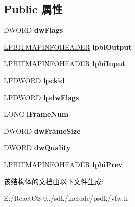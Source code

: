 \subsection*{Public 属性}
\begin{DoxyCompactItemize}
\item 
\mbox{\label{struct_i_c_c_o_m_p_r_e_s_s_a48eb3110e2750e79c5c723f057eb0978}} 
D\+W\+O\+RD {\bfseries dw\+Flags}
\item 
\mbox{\label{struct_i_c_c_o_m_p_r_e_s_s_a4c51ff6f3d5326e42bbf02711e9d8f71}} 
\hyperlink{struct_b_i_t_m_a_p_i_n_f_o_h_e_a_d_e_r}{L\+P\+B\+I\+T\+M\+A\+P\+I\+N\+F\+O\+H\+E\+A\+D\+ER} {\bfseries lpbi\+Output}
\item 
\mbox{\label{struct_i_c_c_o_m_p_r_e_s_s_a01377b34d1490c51fafaec0cab951156}} 
\hyperlink{struct_b_i_t_m_a_p_i_n_f_o_h_e_a_d_e_r}{L\+P\+B\+I\+T\+M\+A\+P\+I\+N\+F\+O\+H\+E\+A\+D\+ER} {\bfseries lpbi\+Input}
\item 
\mbox{\label{struct_i_c_c_o_m_p_r_e_s_s_ad526e0a118c307ee1ff1784d3db1d139}} 
L\+P\+D\+W\+O\+RD {\bfseries lpckid}
\item 
\mbox{\label{struct_i_c_c_o_m_p_r_e_s_s_aca0d4c554cb13c52bf6a5a41e2a8fa4d}} 
L\+P\+D\+W\+O\+RD {\bfseries lpdw\+Flags}
\item 
\mbox{\label{struct_i_c_c_o_m_p_r_e_s_s_a0b160b9f26a9fc426c84428a333794c0}} 
L\+O\+NG {\bfseries l\+Frame\+Num}
\item 
\mbox{\label{struct_i_c_c_o_m_p_r_e_s_s_a1431ecc10ad53064e91c2d7b705b7277}} 
D\+W\+O\+RD {\bfseries dw\+Frame\+Size}
\item 
\mbox{\label{struct_i_c_c_o_m_p_r_e_s_s_a19282cf680ed663366db6f5d35d6cc1b}} 
D\+W\+O\+RD {\bfseries dw\+Quality}
\item 
\mbox{\label{struct_i_c_c_o_m_p_r_e_s_s_a3f9f701fcf2202ddab67b71a483e0786}} 
\hyperlink{struct_b_i_t_m_a_p_i_n_f_o_h_e_a_d_e_r}{L\+P\+B\+I\+T\+M\+A\+P\+I\+N\+F\+O\+H\+E\+A\+D\+ER} {\bfseries lpbi\+Prev}
\end{DoxyCompactItemize}


该结构体的文档由以下文件生成\+:\begin{DoxyCompactItemize}
\item 
E\+:/\+React\+O\+S-\/0../sdk/include/psdk/vfw.\+h\end{DoxyCompactItemize}
